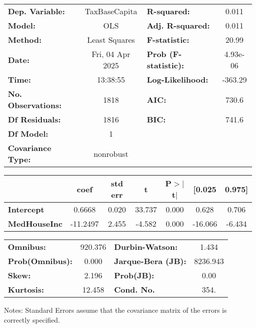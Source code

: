 \begin{center}
\begin{tabular}{lclc}
\toprule
\textbf{Dep. Variable:}    &  TaxBaseCapita   & \textbf{  R-squared:         } &     0.011   \\
\textbf{Model:}            &       OLS        & \textbf{  Adj. R-squared:    } &     0.011   \\
\textbf{Method:}           &  Least Squares   & \textbf{  F-statistic:       } &     20.99   \\
\textbf{Date:}             & Fri, 04 Apr 2025 & \textbf{  Prob (F-statistic):} &  4.93e-06   \\
\textbf{Time:}             &     13:38:55     & \textbf{  Log-Likelihood:    } &   -363.29   \\
\textbf{No. Observations:} &        1818      & \textbf{  AIC:               } &     730.6   \\
\textbf{Df Residuals:}     &        1816      & \textbf{  BIC:               } &     741.6   \\
\textbf{Df Model:}         &           1      & \textbf{                     } &             \\
\textbf{Covariance Type:}  &    nonrobust     & \textbf{                     } &             \\
\bottomrule
\end{tabular}
\begin{tabular}{lcccccc}
                     & \textbf{coef} & \textbf{std err} & \textbf{t} & \textbf{P$> |$t$|$} & \textbf{[0.025} & \textbf{0.975]}  \\
\midrule
\textbf{Intercept}   &       0.6668  &        0.020     &    33.737  &         0.000        &        0.628    &        0.706     \\
\textbf{MedHouseInc} &     -11.2497  &        2.455     &    -4.582  &         0.000        &      -16.066    &       -6.434     \\
\bottomrule
\end{tabular}
\begin{tabular}{lclc}
\textbf{Omnibus:}       & 920.376 & \textbf{  Durbin-Watson:     } &    1.434  \\
\textbf{Prob(Omnibus):} &   0.000 & \textbf{  Jarque-Bera (JB):  } & 8236.943  \\
\textbf{Skew:}          &   2.196 & \textbf{  Prob(JB):          } &     0.00  \\
\textbf{Kurtosis:}      &  12.458 & \textbf{  Cond. No.          } &     354.  \\
\bottomrule
\end{tabular}
\end{center}

Notes: \newline
 [1] Standard Errors assume that the covariance matrix of the errors is correctly specified.